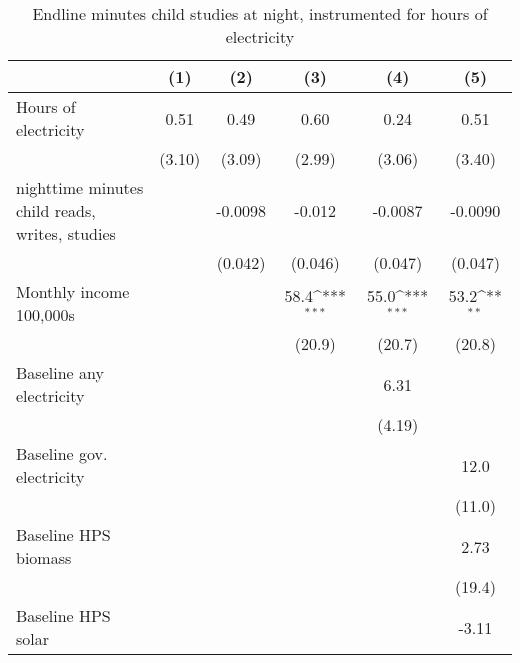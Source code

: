 \begin{table}[htbp]\centering
\def\sym#1{\ifmmode^{#1}\else\(^{#1}\)\fi}
\caption{Endline minutes child studies at night, instrumented for hours of electricity}
\begin{tabular*}{1\hsize}{@{\hskip\tabcolsep\extracolsep\fill}l*{5}{c}}
\toprule
                &\multicolumn{1}{c}{(1)}         &\multicolumn{1}{c}{(2)}         &\multicolumn{1}{c}{(3)}         &\multicolumn{1}{c}{(4)}         &\multicolumn{1}{c}{(5)}         \\
\midrule
Hours of electricity&     0.51         &     0.49         &     0.60         &     0.24         &     0.51         \\
                &   (3.10)         &   (3.09)         &   (2.99)         &   (3.06)         &   (3.40)         \\
nighttime minutes child reads, writes, studies&                  &  -0.0098         &   -0.012         &  -0.0087         &  -0.0090         \\
                &                  &  (0.042)         &  (0.046)         &  (0.047)         &  (0.047)         \\
Monthly income 100,000s&                  &                  &     58.4\sym{***}&     55.0\sym{***}&     53.2\sym{**} \\
                &                  &                  &   (20.9)         &   (20.7)         &   (20.8)         \\
Baseline any electricity&                  &                  &                  &     6.31         &                  \\
                &                  &                  &                  &   (4.19)         &                  \\
Baseline gov. electricity&                  &                  &                  &                  &     12.0         \\
                &                  &                  &                  &                  &   (11.0)         \\
Baseline HPS biomass&                  &                  &                  &                  &     2.73         \\
                &                  &                  &                  &                  &   (19.4)         \\
Baseline HPS solar&                  &                  &                  &                  &    -3.11         \\

\end{tabular*}
\end{table}
